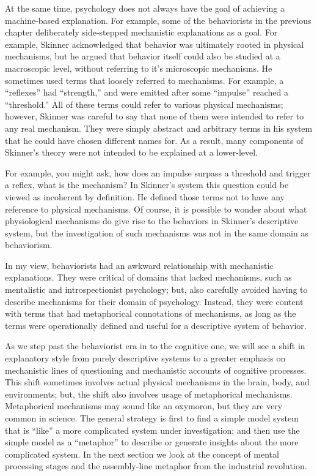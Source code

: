 \documentclass[
  oneside,
  12pt]{crumpbook}
\begin{document}
At the same time, psychology does not always have the goal of achieving a machine-based explanation. For example, some of the behaviorists in the previous chapter deliberately side-stepped mechanistic explanations as a goal. For example, Skinner acknowledged that behavior was ultimately rooted in physical mechanisms, but he argued that behavior itself could also be studied at a macroscopic level, without referring to it's microscopic mechanisms. He sometimes used terms that loosely referred to mechanisms. For example, a ``reflexes'' had ``strength,'' and were emitted after some ``impulse'' reached a ``threshold.'' All of these terms could refer to various physical mechanisms; however, Skinner was careful to say that none of them were intended to refer to any real mechanism. They were simply abstract and arbitrary terms in his system that he could have chosen different names for. As a result, many components of Skinner's theory were not intended to be explained at a lower-level.

For example, you might ask, how does an impulse surpass a threshold and trigger a reflex, what is the mechanism? In Skinner's system this question could be viewed as incoherent by definition. He defined those terms not to have any reference to physical mechanisms. Of course, it is possible to wonder about what physiological mechanisms do give rise to the behaviors in Skinner's descriptive system, but the investigation of such mechanisms was not in the same domain as behaviorism.

In my view, behaviorists had an awkward relationship with mechanistic explanations. They were critical of domains that lacked mechanisms, such as mentalistic and introspectionist psychology; but, also carefully avoided having to describe mechanisms for their domain of psychology. Instead, they were content with terms that had metaphorical connotations of mechanisms, as long as the terms were operationally defined and useful for a descriptive system of behavior.

As we step past the behaviorist era in to the cognitive one, we will see a shift in explanatory style from purely descriptive systems to a greater emphasis on mechanistic lines of questioning and mechanistic accounts of cognitive processes. This shift sometimes involves actual physical mechanisms in the brain, body, and environments; but, the shift also involves usage of metaphorical mechanisms. Metaphorical mechanisms may sound like an oxymoron, but they are very common in science. The general strategy is first to find a simple model system that is ``like'' a more complicated system under investigation; and then use the simple model as a ``metaphor'' to describe or generate insights about the more complicated system. In the next section we look at the concept of mental processing stages and the assembly-line metaphor from the industrial revolution.
\end{document}
